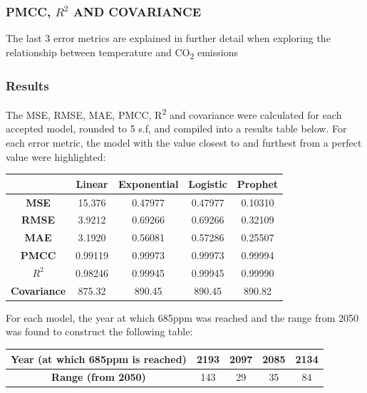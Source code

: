 \documentclass[12pt]{mcmthesis}
\begin{document}
    \subsubsection*{PMCC, ${R^2}$ AND COVARIANCE}
    The last 3 error metrics are explained in further detail when exploring the relationship between temperature and CO\textsubscript{2} emissions

    \subsubsection*{Results}
    The MSE, RMSE, MAE, PMCC, R\textsuperscript{2} and covariance were calculated for each accepted model, rounded to 5 s.f, and compiled into a results table below. For each error metric, the model with the value closest to and furthest from a perfect value were highlighted:

    \begin{center}
        \begin{tabular}{ |c|c|c|c|c|}
            \hline
            & \textbf{Linear} & \textbf{Exponential} & \textbf{Logistic} & \textbf{Prophet} \\
            \hline
            \textbf{MSE}        & 15.376          & 0.47977              & 0.47977           & 0.10310          \\ \hline
            \textbf{RMSE}       & 3.9212          & 0.69266              & 0.69266           & 0.32109          \\ \hline
            \textbf{MAE}        & 3.1920          & 0.56081              & 0.57286           & 0.25507          \\ \hline
            \textbf{PMCC}       & 0.99119         & 0.99973              & 0.99973           & 0.99994          \\ \hline
            \textbf{${R^2}$}    & 0.98246         & 0.99945              & 0.99945           & 0.99990          \\ \hline
            \textbf{Covariance} & 875.32          & 890.45               & 890.45            & 890.82           \\ \hline
        \end{tabular}
    \end{center}

    For each model, the year at which 685ppm was reached and the range from 2050 was found to construct the following table:

    \begin{center}
        \begin{tabular}{ |c|c|c|c|c|}
            \hline
            \textbf{Year (at which 685ppm is reached)} & 2193 & 2097 & 2085 & 2134 \\
            \hline
            \textbf{Range (from 2050)}                 & 143  & 29   & 35   & 84   \\
            \hline
        \end{tabular}
    \end{center}
\end{document}
